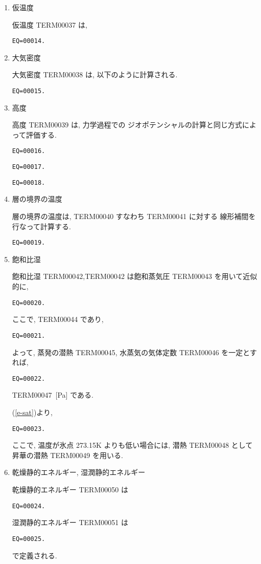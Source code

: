 \begin{enumerate}
\item 仮温度

仮温度 TERM00037 は, 
\begin{verbatim}
EQ=00014.
\end{verbatim}

\item 大気密度

大気密度 TERM00038 は, 以下のように計算される.
\begin{verbatim}
EQ=00015.
\end{verbatim}

\item 高度

高度 TERM00039 は, 力学過程での
ジオポテンシャルの計算と同じ方式によって評価する.
\begin{verbatim}
EQ=00016.
\end{verbatim}
\begin{verbatim}
EQ=00017.
\end{verbatim}
%
\begin{verbatim}
EQ=00018.
\end{verbatim}


\item 層の境界の温度

層の境界の温度は, TERM00040 すなわち TERM00041 に対する
線形補間を行なって計算する.
\begin{verbatim}
EQ=00019.
\end{verbatim}

\item 飽和比湿

飽和比湿 TERM00042,TERM00042
は飽和蒸気圧 TERM00043 を用いて近似的に,
%
\begin{verbatim}
EQ=00020.
\end{verbatim}
%
ここで, TERM00044 であり,
%
\begin{verbatim}
EQ=00021.
\end{verbatim}
%
よって, 蒸発の潜熱 TERM00045, 水蒸気の気体定数 TERM00046 を一定とすれば,
%
\begin{verbatim}
EQ=00022.
\end{verbatim}
%
TERM00047\ [Pa] である.

(\ref{e-sat})より,
%
\begin{verbatim}
EQ=00023.
\end{verbatim}

ここで, 温度が氷点 273.15K よりも低い場合には,
潜熱 TERM00048 として昇華の潜熱 TERM00049 を用いる.

\item 乾燥静的エネルギー, 湿潤静的エネルギー

乾燥静的エネルギー TERM00050 は
\begin{verbatim}
EQ=00024.
\end{verbatim}
%
湿潤静的エネルギー TERM00051 は
\begin{verbatim}
EQ=00025.
\end{verbatim}
で定義される.

\end{enumerate}
